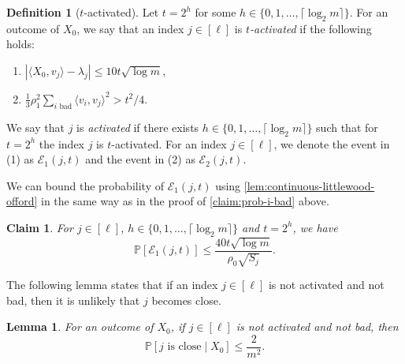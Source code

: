 \documentclass[reqno]{amsart}
\newtheorem{lemma}[theorem]{Lemma}
\newtheorem{claim}[theorem]{Claim}
\theoremstyle{remark}
\theoremstyle{definition}
\newtheorem{definition}[theorem]{Definition}
\numberwithin{theorem}{section}
\renewcommand{\(}{\bigl(}
\renewcommand{\)}{\bigr)\vphantom{)}}
\newcommand{\cE}{\mathcal E}
\renewcommand{\le}{\leqslant}
\renewcommand{\P}{\mathbb{P}}
\newcommand{\ceil}[1]{\lceil#1\rceil}
\newcommand{\ang}[1]{\langle#1\rangle}
\begin{document}
\begin{definition}[$t$-activated]\label{def:activated}
 Let $t = 2^h$ for some $h\in \{0,1,\dots, \ceil{\log_2 m}\}$. For an outcome of $X_0$, we say that an index $j\in [\ell]$ is \emph{$t$-activated} if the following holds:
\begin{enumerate}[label=(\arabic*)]
    \item $|\ang{X_0, v_j} - \lambda_j| \le 10t\sqrt{\log m}$, \label{item:t-activated-1}
    \item $\frac{1}{3}\rho_1^2\sum_{i \text{ bad}}\ang{v_i, v_j}^2 > t^2/4$. \label{item:t-activated-2}
\end{enumerate}
We say that $j$ is \emph{activated} if there exists $h\in \{0,1,\dots, \ceil{\log_2 m}\}$ such that for $t = 2^h$ the index $j$ is $t$-activated. For an index $j\in [\ell]$, we denote the event in (1) as $\cE_1(j,t)$ and the event in (2) as $\cE_2(j,t)$. 
\end{definition}


We can bound the probability of $\cE_1(j,t)$ using \cref{lem:continuous-littlewood-offord} in the same way as in the proof of \cref{claim:prob-i-bad} above. 

\begin{claim}\label{claim:prob-E1jt}
    For $j\in [\ell]$, $h\in \{0,1,\dots, \ceil{\log_2 m}\}$ and $t = 2^h$, we have
    \[\P[\cE_1(j,t)]\le \frac{40t\sqrt{\log m}}{\rho_0\sqrt{S_j}}.\]
\end{claim}


The following lemma states that if an index $j\in [\ell]$ is not activated and not bad, then it is unlikely that $j$ becomes close.

\begin{lemma}\label{lem:not-bad-not-activated}
    For an outcome of $X_0$, if $j\in [\ell]$ is not activated and not bad, then
    \[\P[j\text{ is close} \mid X_0]\le \frac{2}{m^2}.\]
\end{lemma}
\end{document}
